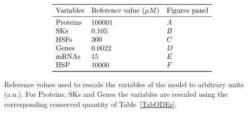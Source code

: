 \documentclass[oneside, 10pt, a4paper, twocolumn]{article}
\begin{document}
\begin{table}[h!]
\[\begin{array}{lll}
\toprule
    \text{Variables} & \text{Reference value ($\mu M$)} & \text{Figures panel} \\
\midrule
    \text{Proteins} & 100001 & A \\
    \text{SKs}      & 0.105  & B \\
    \text{HSFs}     & 300    & C \\
    \text{Genes}    & 0.0022 & D \\
    \text{mRNAs}    & 15     & E \\
    \text{HSP}      & 10000  & F \\
\bottomrule
\end{array}\]
\caption{Reference values used to rescale the variables of the model to arbitrary units (a.u.). For Proteins, SKs and Genes the variables are rescaled using the corresponding conserved quantity of Table~\ref{TabODEs}.}\label{TabRefVal}
\end{table}
\end{document}
